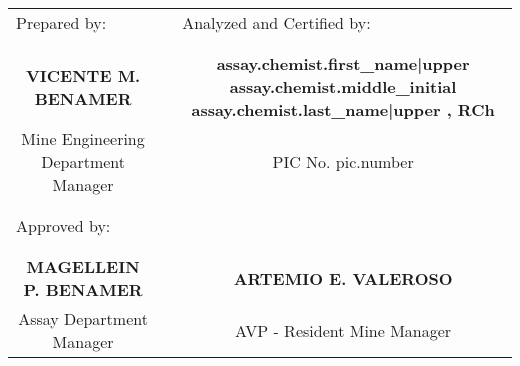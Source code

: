 \documentclass[10pt]{article}
\begin{document}
\begin{tabularx}{0.95\linewidth}{@{}cXc@{}}
    \multicolumn{1}{l}{Prepared by:}
        && \multicolumn{1}{l}{Analyzed and Certified by:} \\
    && \\ && \\
    \bfseries VICENTE M. BENAMER
        && \bfseries {{ assay.chemist.first_name|upper }} {{ assay.chemist.middle_initial }} {{ assay.chemist.last_name|upper }}, RCh \\
    Mine Engineering Department Manager
        && PIC No. {{ pic.number }} \\
    && \\ && \\
    \multicolumn{3}{l}{Approved by:} \\
    && \\ && \\
    \bfseries MAGELLEIN P. BENAMER
        && \bfseries ARTEMIO E. VALEROSO \\
    Assay Department Manager
        && AVP - Resident Mine Manager \\
\end{tabularx}
\end{document}
